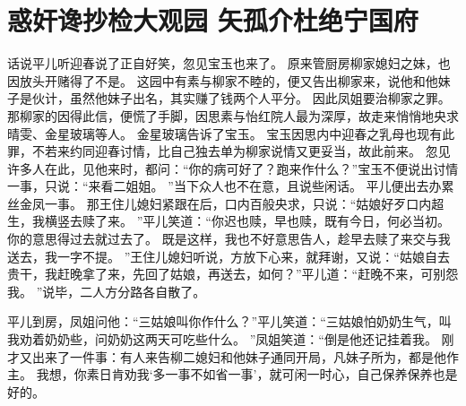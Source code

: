 \chapter{惑奸谗抄检大观园 \quad 矢孤介杜绝宁国府}
\par
{}\par
话说平儿听迎春说了正自好笑，忽见宝玉也来了。
原来管厨房柳家媳妇之妹，也因放头开赌得了不是。
这园中有素与柳家不睦的，便又告出柳家来，说他和他妹子是伙计，虽然他妹子出名，其实赚了钱两个人平分。
因此凤姐要治柳家之罪。
那柳家的因得此信，便慌了手脚，因思素与怡红院人最为深厚，故走来悄悄地央求晴雯、金星玻璃等人。
金星玻璃告诉了宝玉。
宝玉因思内中迎春之乳母也现有此罪，不若来约同迎春讨情，比自己独去单为柳家说情又更妥当，故此前来。
忽见许多人在此，见他来时，都问：“你的病可好了？跑来作什么？”宝玉不便说出讨情一事，只说：“来看二姐姐。
”当下众人也不在意，且说些闲话。
平儿便出去办累丝金凤一事。
那王住儿媳妇紧跟在后，口内百般央求，只说：“姑娘好歹口内超生，我横竖去赎了来。
”平儿笑道：“你迟也赎，早也赎，既有今日，何必当初。
你的意思得过去就过去了。
既是这样，我也不好意思告人，趁早去赎了来交与我送去，我一字不提。
”王住儿媳妇听说，方放下心来，就拜谢，又说：“姑娘自去贵干，我赶晚拿了来，先回了姑娘，再送去，如何？”平儿道：“赶晚不来，可别怨我。
”说毕，二人方分路各自散了。
\par
平儿到房，凤姐问他：“三姑娘叫你作什么？”平儿笑道：“三姑娘怕奶奶生气，叫我劝着奶奶些，问奶奶这两天可吃些什么。
”凤姐笑道：“倒是他还记挂着我。
刚才又出来了一件事：有人来告柳二媳妇和他妹子通同开局，凡妹子所为，都是他作主。
我想，你素日肯劝我‘多一事不如省一事’，就可闲一时心，自己保养保养也是好的。
